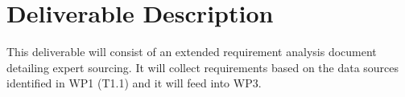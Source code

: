 \section*{Deliverable Description}
This deliverable will consist of an extended requirement analysis document detailing expert sourcing. It will collect requirements based on the data sources identified in WP1 (T1.1) and it will feed into WP3.
\clearpage

